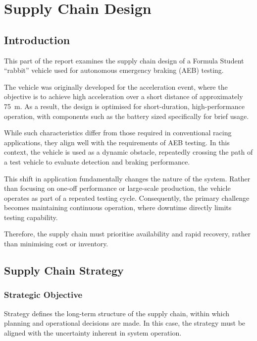 \documentclass[a4paper,11pt]{article}
\begin{document}
\section{Supply Chain Design}

\subsection{Introduction}

This part of the report examines the supply chain design of a Formula Student “rabbit” vehicle used for autonomous emergency braking (AEB) testing.

The vehicle was originally developed for the acceleration event, where the objective is to achieve high acceleration over a short distance of approximately \SI{75}{\meter}. As a result, the design is optimised for short-duration, high-performance operation, with components such as the battery sized specifically for brief usage.

While such characteristics differ from those required in conventional racing applications, they align well with the requirements of AEB testing. In this context, the vehicle is used as a dynamic obstacle, repeatedly crossing the path of a test vehicle to evaluate detection and braking performance.

This shift in application fundamentally changes the nature of the system. Rather than focusing on one-off performance or large-scale production, the vehicle operates as part of a repeated testing cycle. Consequently, the primary challenge becomes maintaining continuous operation, where downtime directly limits testing capability.

Therefore, the supply chain must prioritise availability and rapid recovery, rather than minimising cost or inventory.

\subsection{Supply Chain Strategy}

\subsubsection{Strategic Objective}

Strategy defines the long-term structure of the supply chain, within which planning and operational decisions are made. In this case, the strategy must be aligned with the uncertainty inherent in system operation.
\end{document}
